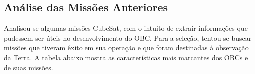 \begin{apendicesenv}

\partapendices

\chapter{Análise das Missões Anteriores}
\label{apendicea}

Analisou-se algumas missões CubeSat, com o intuito de extrair informações que pudessem ser úteis no desenvolvimento do OBC. Para a seleção, tentou-se buscar missões que tiveram êxito em sua operação e que foram destinadas à observação da Terra. A tabela abaixo mostra as características mais marcantes dos OBCs e de suas missões.


\begin{table}[h]
\centering
\caption{Análise de OBCs em Missões Passadas}
\label{apendicea_tabela}
\end{table}
\end{apendicesenv}
